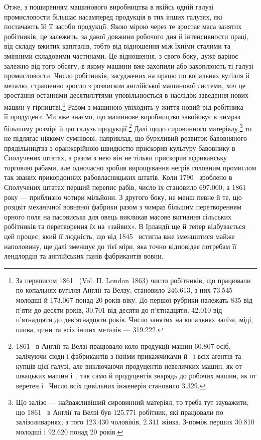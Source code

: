 Отже, з поширенням машинового виробництва в якійсь одній
галузі промисловости більшає насамперед продукція в тих інших
галузях, які постачають їй її засоби продукції. Якою мірою
через те зростає маса занятих робітників, це залежить, за
даної довжини робочого дня й інтенсивности праці, від складу
вжитих капіталів, тобто від відношення між їхніми сталими та
змінними складовими частинами. Це відношення, з свого боку,
дуже варіює залежно від того обсягу, в якому машини вже захопили
або захоплюють ті галузі промисловости. Число робітників,
засуджених на працю по копальнях вугілля й металю, страшенно
зросло з розвитком англійської машинової системи, хоч це зростання
останніми десятиліттями уповільнюється в наслідок заведення
нових машин у гірництві.\footnote{
За переписом 1861~ (Vol. II. London 1863) число робітників,
що працювали по копальнях вугілля Англії та Велзу, становило \num{246.613},
з них \num{73.545} молодші й \num{173.067} понад 20 років віку. До першої рубрики
належать 835 від п’яти до десяти років, \num{30.701} від десяти до п’ятнадцяти,
\num{42.010} від п’ятнадцяти до дев’ятнадцяти років. Число занятих
на копальнях заліза, міді, олива, цини та всіх інших металів — \num{319.222}.
} Разом з машиною увіходить
у життя новий рід робітника — її продуцент. Ми вже знаємо, що
машинове виробництво завойовує в чимраз більшому розмірі й
цю галузь продукції.\footnote{
1861~ в Англії та Велзі працювало коло продукції машин \num{60.807}
осіб, залічуючи сюди і фабрикантів з їхніми прикажчиками й~ і всіх
аґентів та купців цієї галузі, але виключаючи продуцентів невеличких
машин, як от швацьких машин і~, так само й продуцентів знарядь
до робочих машин, як от веретен і~ Число всіх цивільних інженерів
становило \num{3.329}.
} Далі щодо сировинного матеріялу,\footnote{
Що залізо — найважливіший сировинний матеріял, то треба тут
зауважити, що 1861~ в Англії та Велзі був \num{125.771} робітник, які
працювали по залізоливарнях, з того \num{123.430} чоловіків, \num{2.341} жінка.
З-поміж перших \num{30.810} молодші і \num{92.620} понад 20 років.
} то не підлягає ніякому сумнівові, наприклад, що бурхливий розвиток
бавовняного прядільництва з оранжерійною швидкістю прискорив
культуру бавовнику в Сполучених штатах, а разом з нею
він не тільки прискорив африканську торговлю рабами, але
одночасно зробив вирощування негрів головним промислом так
званих прикордонних рабовласницьких штатів. Коли 1790~
зроблено в Сполучених штатах перший перепис рабів, число їх
становило \num{697.000}, а 1861 року — приблизно чотири мільйони.
З другого боку, не менш певне й те, що розцвіт механічної вовняної
фабрики разом з чимраз більшим перетворенням орного поля на
пасовиська для овець викликав масове вигнання сільських робітників
та перетворення їх на «зайвих». В Ірландії ще й тепер
відбувається цей процес, який її людність, що від 1845~ встигла
вже зменшитися майже наполовину, ще далі зменшує до тієї
міри, яка точно відповідає потребам її лендлордів та англійських
панів фабрикантів вовни.

